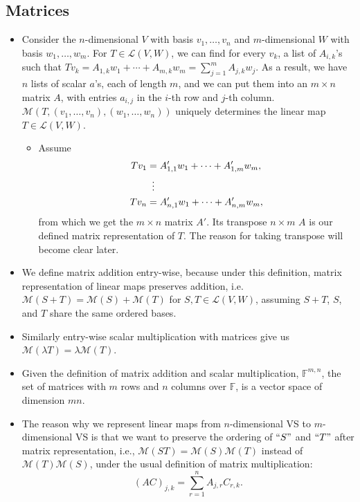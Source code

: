 \documentclass{article}
\newcommand{\F}{\mathbb{F}}
\newcommand{\LVW}{\mathcal{L}(V,W)}
\newcommand{\M}{\mathcal{M}}
\newcommand{\bv}{v_1,\dots,v_n}
\newcommand{\bw}{w_1,\dots,w_n}
\begin{document}
\subsection{Matrices}
\begin{itemize}
    \item Consider the $n$-dimensional $V$ with basis $\bv$ and $m$-dimensional $W$ with basis $w_1,\dots,w_m$. For $T \in \LVW$, we can find for every $v_k$, a list of $A_{i,k}$'s such that $Tv_k = A_{1,k}w_1 +\cdots+ A_{m,k}w_m = \sum_{j=1}^m A_{j,k}w_j$. As a result, we have $n$ lists of scalar $a$'s, each of length $m$, and we can put them into an $m \times n$ matrix $A$, with entries $a_{i,j}$ in the $i$-th row and $j$-th column. $\mathcal{M}(T,(\bv),(\bw))$ uniquely determines the linear map $T \in \LVW$.
    \begin{itemize}
        \item Assume
        \begin{align*}
            Tv_1 & = A'_{1,1} w_1 + \dots + A'_{1,m} w_m, \\
            & \vdotswithin{=} \\
            Tv_n & = A'_{n,1} w_1 + \dots + A'_{n,m} w_m,
        \end{align*}
        from which we get the $m \times n$ matrix $A'$. Its transpose $n \times m$ $A$ is our defined matrix representation of $T$. The reason for taking transpose will become clear later.
    \end{itemize}
    \item We define matrix addition entry-wise, because under this definition, matrix representation of linear maps preserves addition, i.e. $\M(S+T) = \M(S) + \M(T)$ for $S,T \in \LVW$, assuming $S+T$, $S$, and $T$ share the same ordered bases.
    \item Similarly entry-wise scalar multiplication with matrices give us $\M(\lambda T) = \lambda \M(T)$.
    \item Given the definition of matrix addition and scalar multiplication, $\F^{m,n}$, the set of matrices with $m$ rows and $n$ columns over $\F$, is a vector space of dimension $mn$.
    \item The reason why we represent linear maps from $n$-dimensional VS to $m$-dimensional VS is that we want to preserve the ordering of $``S"$ and $``T"$ after matrix representation, i.e., $\M(ST) = \M(S)\M(T)$ instead of $\M(T)\M(S)$, under the usual definition of matrix multiplication: $$(AC)_{j,k} = \sum_{r = 1}^n A_{j,r}C_{r,k}.$$
    \begin{itemize}

\end{itemize}
\end{itemize}
\end{document}
